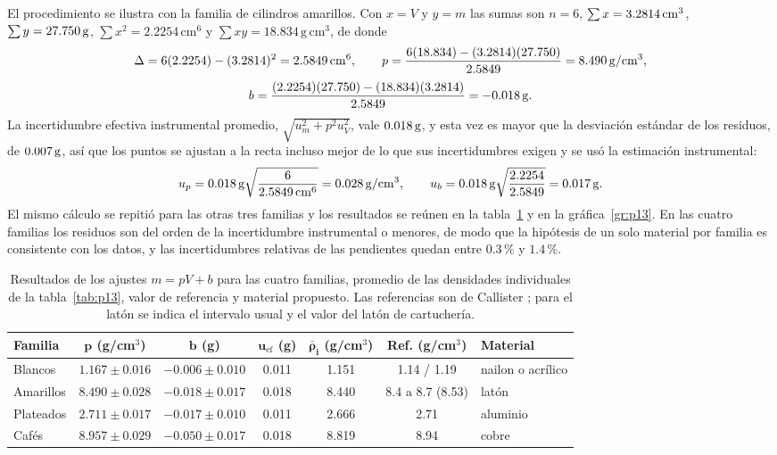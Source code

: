 El procedimiento se ilustra con la familia de cilindros amarillos. Con $x = V$ y $y = m$ las sumas son $n = 6$, $\sum x = 3.2814\,\mathrm{cm^{3}}$, $\sum y = 27.750\,\mathrm{g}$, $\sum x^{2} = 2.2254\,\mathrm{cm^{6}}$ y $\sum xy = 18.834\,\mathrm{g\,cm^{3}}$, de donde
\begin{equation*}
    \Delta = 6(2.2254) - (3.2814)^{2} = 2.5849\,\mathrm{cm^{6}}, \qquad
    p = \frac{6(18.834) - (3.2814)(27.750)}{2.5849} = 8.490\,\mathrm{g/cm^{3}},
\end{equation*}
\begin{equation*}
    b = \frac{(2.2254)(27.750) - (18.834)(3.2814)}{2.5849} = -0.018\,\mathrm{g}.
\end{equation*}
La incertidumbre efectiva instrumental promedio, $\sqrt{u_m^{2} + p^{2}u_V^{2}}$, vale $0.018\,\mathrm{g}$, y esta vez es mayor que la desviación estándar de los residuos, de $0.007\,\mathrm{g}$, así que los puntos se ajustan a la recta incluso mejor de lo que sus incertidumbres exigen y se usó la estimación instrumental:
\begin{equation*}
    u_p = 0.018\,\mathrm{g}\sqrt{\frac{6}{2.5849\,\mathrm{cm^{6}}}} = 0.028\,\mathrm{g/cm^{3}}, \qquad
    u_b = 0.018\,\mathrm{g}\sqrt{\frac{2.2254}{2.5849}} = 0.017\,\mathrm{g}.
\end{equation*}
El mismo cálculo se repitió para las otras tres familias y los resultados se reúnen en la tabla~\ref{tab:p13_ajustes} y en la gráfica~\ref{gr:p13}. En las cuatro familias los residuos son del orden de la incertidumbre instrumental o menores, de modo que la hipótesis de un solo material por familia es consistente con los datos, y las incertidumbres relativas de las pendientes quedan entre $0.3\,\%$ y $1.4\,\%$.

\begin{table}[H]
    \centering
    \caption{Resultados de los ajustes $m = pV + b$ para las cuatro familias, promedio de las densidades individuales de la tabla~\ref{tab:p13}, valor de referencia y material propuesto. Las referencias son de Callister \cite{callister}; para el latón se indica el intervalo usual y el valor del latón de cartuchería.}
    \label{tab:p13_ajustes}
    \begin{tabular}{l c c c c c l}
        \toprule
        \textbf{Familia} & $\bm{p}$ (g/cm$^{3}$) & $\bm{b}$ (g) & $\bm{u_{\mathrm{ef}}}$ (g) & $\bm{\bar\rho_i}$ (g/cm$^{3}$) & \textbf{Ref.} (g/cm$^{3}$) & \textbf{Material} \\
        \midrule
        Blancos   & $1.167 \pm 0.016$ & $-0.006 \pm 0.010$ & 0.011 & 1.151 & 1.14 / 1.19 & nailon o acrílico \\
        Amarillos & $8.490 \pm 0.028$ & $-0.018 \pm 0.017$ & 0.018 & 8.440 & 8.4 a 8.7 (8.53) & latón \\
        Plateados & $2.711 \pm 0.017$ & $-0.017 \pm 0.010$ & 0.011 & 2.666 & 2.71 & aluminio \\
        Cafés     & $8.957 \pm 0.029$ & $-0.050 \pm 0.017$ & 0.018 & 8.819 & 8.94 & cobre \\
        \bottomrule
    \end{tabular}
\end{table}

